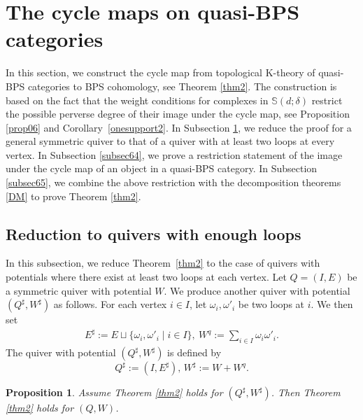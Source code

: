 \documentclass [11pt,oneside,a4paper,mathscr]{amsart}
\newtheorem{prop}[thm]{Proposition}
\theoremstyle{definition}
\begin{document}
\section{The cycle maps on quasi-BPS categories}\label{sec:proof}
In this section, we construct the cycle map from topological K-theory of quasi-BPS categories to BPS cohomology, see Theorem \ref{thm2}. 
The construction is based on the fact that the weight conditions for complexes in $\mathbb{S}(d;\delta)$ restrict the possible perverse degree of their image under the cycle map, see Proposition \ref{prop06} and Corollary~\ref{onesupport2}.
In Subsection \ref{reduce}, we reduce the proof for a general symmetric quiver to that of a quiver with at least two loops at every vertex.
In Subsection \ref{subsec64}, we prove a restriction statement of the image under the cycle map of an object in a quasi-BPS category. In Subsection \ref{subsec65}, we combine the above restriction with the decomposition theorems \eqref{DM} to prove Theorem \ref{thm2}.





\subsection{Reduction to quivers with enough loops}\label{subsec:reduce}
In this subsection, 
we reduce Theorem~\ref{thm2} to the case of quivers 
with potentials where there exist at least
two loops at each vertex. 
Let $Q=(I, E)$ be a symmetric quiver 
with potential $W$. 
We produce another quiver with potential 
$(Q^{\sharp}, W^{\sharp})$ as follows. 
For each vertex $i\in I$, let $\omega_i, \omega'_i$ be two loops at $i$. 
We then set 
\begin{align*}
E^\sharp:=E\sqcup\{\omega_i, \omega'_i\mid i\in I\}, \ W^q:=\sum_{i\in I}\omega_i\omega'_i.
\end{align*}
The quiver with potential $(Q^{\sharp}, W^{\sharp})$
is defined by 
    \[Q^\sharp:=(I,E^\sharp),\, W^\sharp:=W+W^q.\]

\begin{prop}\label{reduce}
Assume Theorem \ref{thm2} holds for $(Q^\sharp, W^\sharp)$. Then Theorem \ref{thm2} holds for $(Q,W)$.
\end{prop}
\end{document}

